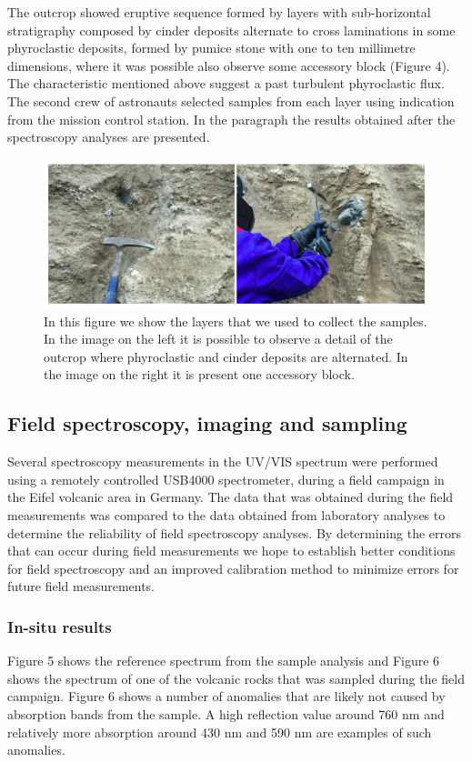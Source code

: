 \documentclass[preprint]{elsarticle}
\begin{document}
The outcrop showed eruptive sequence formed by layers with sub-horizontal stratigraphy composed by cinder deposits alternate to cross laminations in some phyroclastic deposits, formed by pumice stone with one to ten millimetre dimensions, where it was possible also observe some accessory block (Figure 4). The characteristic mentioned above suggest a past turbulent phyroclastic flux. The second crew of astronauts selected samples from each layer using indication from the mission control station. In the paragraph the results obtained after the spectroscopy analyses are presented.

\begin{figure}
\centering
\includegraphics{img/figure04.png}
\caption{In this figure we show the layers that we used to collect the samples. In the image on the left it is possible to observe a detail of the outcrop where phyroclastic and cinder deposits are alternated. In the image on the right it is present one accessory block.}
\label{fig:f04}
\end{figure}

\subsection{Field spectroscopy, imaging and sampling}
Several spectroscopy measurements in the UV/VIS spectrum were performed using a remotely controlled USB4000 spectrometer, during a field campaign in the Eifel volcanic area in Germany. The data that was obtained during the field measurements was compared to the data obtained from laboratory analyses to determine the reliability of field spectroscopy analyses. By determining the errors that can occur during field measurements we hope to establish better conditions for field spectroscopy and an improved calibration method to minimize errors for future field measurements.

\subsubsection{In-situ results}
Figure 5 shows the reference spectrum from the sample analysis and Figure 6 shows the spectrum of one of the volcanic rocks that was sampled during the field campaign. Figure 6 shows a number of anomalies that are likely not caused by absorption bands from the sample. A high reflection value around 760 nm and relatively more absorption around 430 nm and 590 nm are examples of such anomalies.
\end{document}
